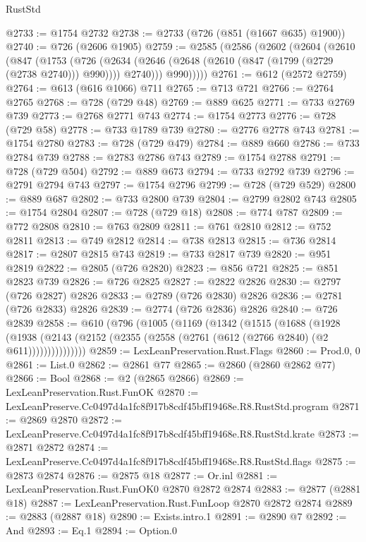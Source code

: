 \begin{lexlean}{RustStd}
\begin{coremodule}
@2733 := @1754 @2732
@2738 := @2733 (@726 (@851 (@1667 @635) @1900))
@2740 := @726 (@2606 @1905)
@2759 := @2585
    (@2586
      (@2602
        (@2604
          (@2610
            (@847
              (@1753
                (@726
                  (@2634 (@2646 (@2648 (@2610 (@847 (@1799 (@2729 (@2738 @2740))) @990)))) @2740)))
              @990)))))
@2761 := @612 (@2572 @2759)
@2764 := @613 (@616 @1066) @711
@2765 := @713 @721
@2766 := @2764 @2765
@2768 := @728 (@729 @48)
@2769 := @889 @625
@2771 := @733 @2769 @739
@2773 := @2768 @2771 @743
@2774 := @1754 @2773
@2776 := @728 (@729 @58)
@2778 := @733 @1789 @739
@2780 := @2776 @2778 @743
@2781 := @1754 @2780
@2783 := @728 (@729 @479)
@2784 := @889 @660
@2786 := @733 @2784 @739
@2788 := @2783 @2786 @743
@2789 := @1754 @2788
@2791 := @728 (@729 @504)
@2792 := @889 @673
@2794 := @733 @2792 @739
@2796 := @2791 @2794 @743
@2797 := @1754 @2796
@2799 := @728 (@729 @529)
@2800 := @889 @687
@2802 := @733 @2800 @739
@2804 := @2799 @2802 @743
@2805 := @1754 @2804
@2807 := @728 (@729 @18)
@2808 := @774 @787
@2809 := @772 @2808
@2810 := @763 @2809
@2811 := @761 @2810
@2812 := @752 @2811
@2813 := @749 @2812
@2814 := @738 @2813
@2815 := @736 @2814
@2817 := @2807 @2815 @743
@2819 := @733 @2817 @739
@2820 := @951 @2819
@2822 := @2805 (@726 @2820)
@2823 := @856 @721
@2825 := @851 @2823 @739
@2826 := @726 @2825
@2827 := @2822 @2826
@2830 := @2797 (@726 @2827) @2826
@2833 := @2789 (@726 @2830) @2826
@2836 := @2781 (@726 @2833) @2826
@2839 := @2774 (@726 @2836) @2826
@2840 := @726 @2839
@2858 := @610
    (@796
      (@1005
        (@1169
          (@1342
            (@1515
              (@1688
                (@1928
                  (@1938
                    (@2143 (@2152 (@2355 (@2558 (@2761 (@612 (@2766 @2840) (@2 @611)))))))))))))))
@2859 := LexLeanPreservation.Rust.Flags
@2860 := Prod.{0, 0}
@2861 := List.{0}
@2862 := @2861 @77
@2865 := @2860 (@2860 @2862 @77)
@2866 := Bool
@2868 := @2 (@2865 @2866)
@2869 := LexLeanPreservation.Rust.FunOK
@2870 := LexLeanPreserve.Cc0497d4a1fc8f917b8cdf45bff19468e.R8.RustStd.program
@2871 := @2869 @2870
@2872 := LexLeanPreserve.Cc0497d4a1fc8f917b8cdf45bff19468e.R8.RustStd.krate
@2873 := @2871 @2872
@2874 := LexLeanPreserve.Cc0497d4a1fc8f917b8cdf45bff19468e.R8.RustStd.flags
@2875 := @2873 @2874
@2876 := @2875 @18
@2877 := Or.inl
@2881 := LexLeanPreservation.Rust.FunOK0 @2870 @2872 @2874
@2883 := @2877 (@2881 @18)
@2887 := LexLeanPreservation.Rust.FunLoop @2870 @2872 @2874
@2889 := @2883 (@2887 @18)
@2890 := Exists.intro.{1}
@2891 := @2890 @7
@2892 := And
@2893 := Eq.{1}
@2894 := Option.{0}

\end{coremodule}
\end{lexlean}

